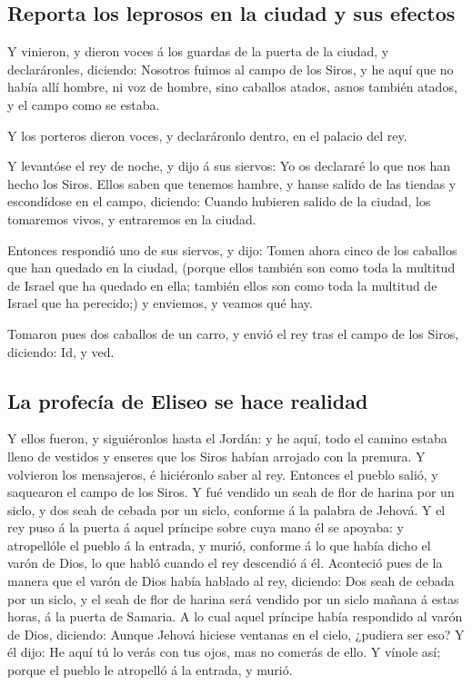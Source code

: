 \hypertarget{reporta-los-leprosos-en-la-ciudad-y-sus-efectos}{%
\subsection{Reporta los leprosos en la ciudad y sus
efectos}\label{reporta-los-leprosos-en-la-ciudad-y-sus-efectos}}

 Y vinieron, y dieron voces á los guardas de la puerta de
la ciudad, y declaráronles, diciendo: Nosotros fuimos al campo de los
Siros, y he aquí que no había allí hombre, ni voz de hombre, sino
caballos atados, asnos también atados, y el campo como se estaba.

 Y los porteros dieron voces, y declaráronlo dentro, en
el palacio del rey.

 Y levantóse el rey de noche, y dijo á sus siervos: Yo os
declararé lo que nos han hecho los Siros. Ellos saben que tenemos
hambre, y hanse salido de las tiendas y escondídose en el campo,
diciendo: Cuando hubieren salido de la ciudad, los tomaremos vivos, y
entraremos en la ciudad.

 Entonces respondió uno de sus siervos, y dijo: Tomen
ahora cinco de los caballos que han quedado en la ciudad, (porque ellos
también son como toda la multitud de Israel que ha quedado en ella;
también ellos son como toda la multitud de Israel que ha perecido;) y
enviemos, y veamos qué hay.

 Tomaron pues dos caballos de un carro, y envió el rey
tras el campo de los Siros, diciendo: Id, y ved.

\hypertarget{la-profecuxeda-de-eliseo-se-hace-realidad}{%
\subsection{La profecía de Eliseo se hace
realidad}\label{la-profecuxeda-de-eliseo-se-hace-realidad}}

 Y ellos fueron, y siguiéronlos hasta el Jordán: y he
aquí, todo el camino estaba lleno de vestidos y enseres que los Siros
habían arrojado con la premura. Y volvieron los mensajeros, é hiciéronlo
saber al rey.  Entonces el pueblo salió, y saquearon el
campo de los Siros. Y fué vendido un seah de flor de harina por un
siclo, y dos seah de cebada por un siclo, conforme á la palabra de
Jehová.  Y el rey puso á la puerta á aquel príncipe sobre
cuya mano él se apoyaba: y atropellóle el pueblo á la entrada, y murió,
conforme á lo que había dicho el varón de Dios, lo que habló cuando el
rey descendió á él.  Aconteció pues de la manera que el
varón de Dios había hablado al rey, diciendo: Dos seah de cebada por un
siclo, y el seah de flor de harina será vendido por un siclo mañana á
estas horas, á la puerta de Samaria.  A lo cual aquel
príncipe había respondido al varón de Dios, diciendo: Aunque Jehová
hiciese ventanas en el cielo, ¿pudiera ser eso? Y él dijo: He aquí tú lo
verás con tus ojos, mas no comerás de ello.  Y vínole
así; porque el pueblo le atropelló á la entrada, y murió.

